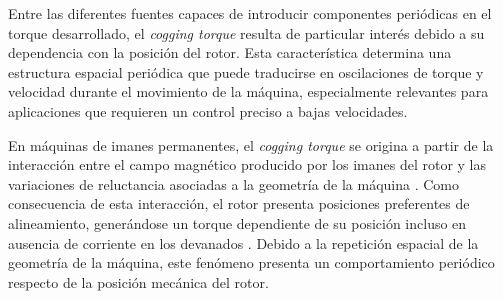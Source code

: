 Entre las diferentes fuentes capaces de introducir componentes periódicas en el torque desarrollado, el \textit{cogging torque} resulta de particular interés debido a su dependencia con la posición del rotor. Esta característica determina una estructura espacial periódica que puede traducirse en oscilaciones de torque y velocidad durante el movimiento de la máquina, especialmente relevantes para aplicaciones que requieren un control preciso a bajas velocidades.
%
%
%
%
%
%
%
%
%
%
%
%
%
%
%
%
%

En máquinas de imanes permanentes, el \textit{cogging torque} se origina a partir de la interacción entre el campo magnético producido por los imanes del rotor y las variaciones de reluctancia asociadas a la geometría de la máquina \cite{guzinskiSensorlessLowSpeed2019,piccoliCoggingTorqueRipple2014a}. Como consecuencia de esta interacción, el rotor presenta posiciones preferentes de alineamiento, generándose un torque dependiente de su posición incluso en ausencia de corriente en los devanados \cite{piccoliCoggingTorqueRipple2014a}. Debido a la repetición espacial de la geometría de la máquina, este fenómeno presenta un comportamiento periódico respecto de la posición mecánica del rotor.

